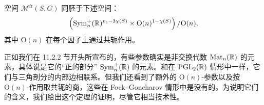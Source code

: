 
\begin{theorem}[11.40]
空间 $\mathcal{M}^{\mathrm{fr}}(S,G)$ 同胚于下述空间：
\[
\left(\operatorname{Sym}_n^{+}(\mathbb{R})^{p_e-3\chi(S)}\times\mathrm{O}(n)^{1-\chi(S)}\right)/\mathrm{O}(n),
\]
其中 $\mathrm{O}(n)$ 在每个因子上通过共轭作用。
\end{theorem}

\begin{remark}[11.41]
正如我们在 11.2.2 节开头所宣布的，有些参数确实是非交换代数 $\operatorname{Mat}_n(\mathbb{R})$ 的元素，具体说是它的“正的部分” $\operatorname{Sym}_n^{+}(\mathbb{R})$ 的元素。和在 $\operatorname{PGL}_2(\mathbb{R})$ 情形中一样，它们与三角剖分的内部边相联系。但我们还看到了额外的 $\mathrm{O}(n)$-参数以及按 $\mathrm{O}(n)$-作用取共轭的商，这些在 Fock--Goncharov 情形中是没有的。为说明它们的含义，我们给出这个定理的证明，尽管它相当技术性。
\end{remark}

